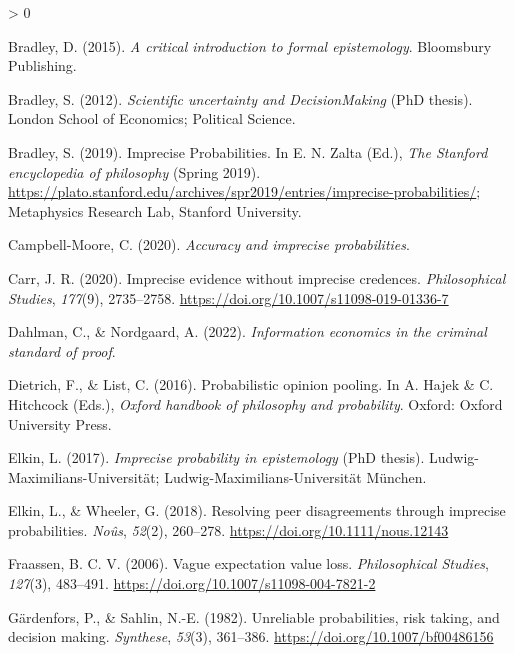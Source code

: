 \documentclass[
  10pt,
  dvipsnames,enabledeprecatedfontcommands]{scrartcl}
\newlength{\cslhangindent}
\newenvironment{CSLReferences}[2] %
 {%
  \setlength{\parindent}{0pt}
  \ifodd #1 \everypar{\setlength{\hangindent}{\cslhangindent}}\ignorespaces\fi
  \ifnum #2 > 0
  \setlength{\parskip}{#2\baselineskip}
  \fi
 }%
 {}
\begin{document}
\hypertarget{refs}{}
\begin{CSLReferences}{1}{0}
\leavevmode\hypertarget{ref-bradley2015critical}{}%
Bradley, D. (2015). \emph{A critical introduction to formal
epistemology}. Bloomsbury Publishing.

\leavevmode\hypertarget{ref-bradley2012uncertaintyPhD}{}%
Bradley, S. (2012). \emph{Scientific uncertainty and DecisionMaking}
(PhD thesis). London School of Economics; Political Science.

\leavevmode\hypertarget{ref-bradley2019imprecise}{}%
Bradley, S. (2019). {Imprecise Probabilities}. In E. N. Zalta (Ed.),
\emph{The {Stanford} encyclopedia of philosophy} ({S}pring 2019).
\url{https://plato.stanford.edu/archives/spr2019/entries/imprecise-probabilities/};
Metaphysics Research Lab, Stanford University.

\leavevmode\hypertarget{ref-CampbellMoore2020accuracy}{}%
Campbell-Moore, C. (2020). \emph{Accuracy and imprecise probabilities}.

\leavevmode\hypertarget{ref-Carr2020impreciseEvidence}{}%
Carr, J. R. (2020). Imprecise evidence without imprecise credences.
\emph{Philosophical Studies}, \emph{177}(9), 2735--2758.
\url{https://doi.org/10.1007/s11098-019-01336-7}

\leavevmode\hypertarget{ref-Dahlman2022Information}{}%
Dahlman, C., \& Nordgaard, A. (2022). \emph{Information economics in the
criminal standard of proof}.

\leavevmode\hypertarget{ref-Dietrich2016pooling}{}%
Dietrich, F., \& List, C. (2016). Probabilistic opinion pooling. In A.
Hajek \& C. Hitchcock (Eds.), \emph{Oxford handbook of philosophy and
probability}. Oxford: Oxford University Press.

\leavevmode\hypertarget{ref-Lee2017impreciseEpistemology}{}%
Elkin, L. (2017). \emph{Imprecise probability in epistemology} (PhD
thesis). Ludwig-Maximilians-Universit{ä}t;
Ludwig-Maximilians-Universität München.

\leavevmode\hypertarget{ref-Elkin2018resolving}{}%
Elkin, L., \& Wheeler, G. (2018). Resolving peer disagreements through
imprecise probabilities. \emph{Noûs}, \emph{52}(2), 260--278.
\url{https://doi.org/10.1111/nous.12143}

\leavevmode\hypertarget{ref-VanFraassen2006vague}{}%
Fraassen, B. C. V. (2006). Vague expectation value loss.
\emph{Philosophical Studies}, \emph{127}(3), 483--491.
\url{https://doi.org/10.1007/s11098-004-7821-2}

\leavevmode\hypertarget{ref-Gardenfors1982unreliable}{}%
Gärdenfors, P., \& Sahlin, N.-E. (1982). Unreliable probabilities, risk
taking, and decision making. \emph{Synthese}, \emph{53}(3), 361--386.
\url{https://doi.org/10.1007/bf00486156}


\end{CSLReferences}
\end{document}
